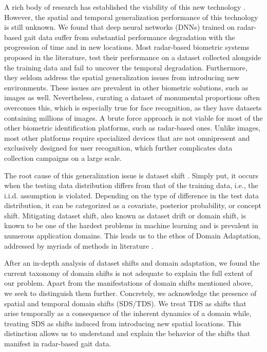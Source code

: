 \documentclass{article}
\begin{document}
A rich body of research has established the viability of this new technology \cite{wifigait1,pokkunuru2018neuralwave, jakkala2019deep, janakaraj2019star, pegoraro2020multi, huang2020multi, lang2019person, abdulatif2018study, qiao2020human, lang2019joint,gesture1,gesture2,lip1,lip2,heart1,heart2}. However, the spatial and temporal generalization performance of this technology is still unknown. We found that deep neural networks (DNNs) trained on radar-based gait data suffer from substantial performance degradation with the progression of time and in new locations. Most radar-based biometric systems proposed in the literature, test their performance on a dataset collected alongside the training data and fail to uncover the temporal degradation. Furthermore, they seldom address the spatial generalization issues from introducing new environments. These issues are prevalent in other biometric solutions, such as images as well. Nevertheless, curating a dataset of monumental proportions often overcomes this, which is especially true for face recognition, as they have datasets containing millions of images. A brute force approach is not viable for most of the other biometric identification platforms, such as radar-based ones. Unlike images, most other platforms require specialized devices that are not omnipresent and exclusively designed for user recognition, which further complicates data collection campaigns on a large scale.

The root cause of this generalization issue is dataset shift \cite{moreno2012unifying}. Simply put, it occurs when the testing data distribution differs from that of the training data, i.e., the i.i.d. assumption is violated. Depending on the type of difference in the test data distribution, it can be categorized as a covariate, posterior probability, or concept shift. Mitigating dataset shift, also known as dataset drift or domain shift, is known to be one of the hardest problems in machine learning and is prevalent in numerous application domains. This leads us to the ethos of Domain Adaptation, addressed by myriads of methods in literature \cite{wang2018deep}.

After an in-depth analysis of dataset shifts and domain adaptation, we found the current taxonomy of domain shifts is not adequate to explain the full extent of our problem. Apart from the manifestations of domain shifts mentioned above, we seek to distinguish them further. Concretely, we acknowledge the presence of spatial and temporal domain shifts (SDS/TDS). We treat TDS as shifts that arise temporally as a consequence of the inherent dynamics of a domain while, treating SDS as shifts induced from introducing new spatial locations. This distinction allows us to understand and explain the behavior of the shifts that manifest in radar-based gait data.
\end{document}
